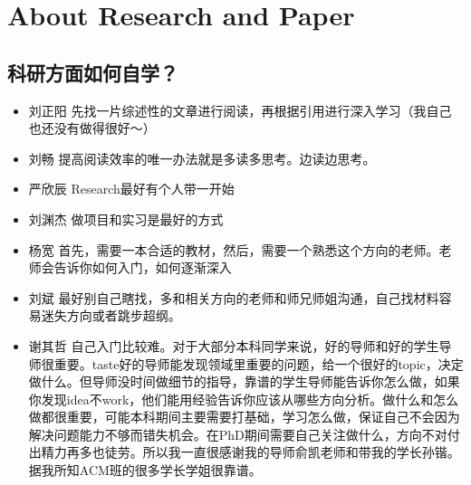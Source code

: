 \documentclass{vivid_layout}
\begin{document}
\section{About Research and Paper}
\addtocounter{section}{1}
\setcounter{subsection}{0}

\subsection{科研方面如何自学？}
\begin{itemize}
\item { 刘正阳}  \quad  先找一片综述性的文章进行阅读，再根据引用进行深入学习（我自己也还没有做得很好～）
\item  { 刘畅}  \quad 提高阅读效率的唯一办法就是多读多思考。边读边思考。
\item  { 严欣辰}  \quad Research最好有个人带一开始
\item  { 刘渊杰}  \quad 做项目和实习是最好的方式
\item  { 杨宽}  \quad 首先，需要一本合适的教材，然后，需要一个熟悉这个方向的老师。老师会告诉你如何入门，如何逐渐深入
\item  { 刘斌}  \quad 最好别自己瞎找，多和相关方向的老师和师兄师姐沟通，自己找材料容易迷失方向或者跳步超纲。
\item  { 谢其哲}  \quad 自己入门比较难。对于大部分本科同学来说，好的导师和好的学生导师很重要。taste好的导师能发现领域里重要的问题，给一个很好的topic，决定做什么。但导师没时间做细节的指导，靠谱的学生导师能告诉你怎么做，如果你发现idea不work，他们能用经验告诉你应该从哪些方向分析。做什么和怎么做都很重要，可能本科期间主要需要打基础，学习怎么做，保证自己不会因为解决问题能力不够而错失机会。在PhD期间需要自己关注做什么，方向不对付出精力再多也徒劳。所以我一直很感谢我的导师俞凯老师和带我的学长孙锴。据我所知ACM班的很多学长学姐很靠谱。
\end{itemize}
\end{document}
